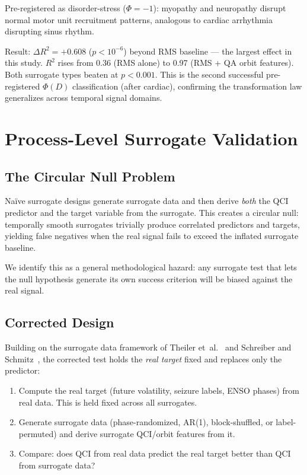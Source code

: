 \documentclass[11pt,a4paper]{article}
\begin{document}
Pre-registered as disorder-stress ($\Phi = -1$): myopathy and neuropathy
disrupt normal motor unit recruitment patterns, analogous to cardiac
arrhythmia disrupting sinus rhythm.

Result: $\Delta R^2 = +0.608$ ($p < 10^{-6}$) beyond RMS baseline ---
the largest effect in this study. $R^2$ rises from 0.36 (RMS alone) to
0.97 (RMS + QA orbit features). Both surrogate types beaten at
$p < 0.001$. This is the second successful pre-registered $\Phi(D)$
classification (after cardiac), confirming the transformation law
generalizes across temporal signal domains.

\section{Process-Level Surrogate Validation}
\label{sec:surrogates}

\subsection{The Circular Null Problem}

Na\"ive surrogate designs generate surrogate data and then derive
\emph{both} the QCI predictor and the target variable from the surrogate.
This creates a circular null: temporally smooth surrogates trivially produce
correlated predictors and targets, yielding false negatives when the
real signal fails to exceed the inflated surrogate baseline.

We identify this as a general methodological hazard: any surrogate test
that lets the null hypothesis generate its own success criterion will be
biased against the real signal.

\subsection{Corrected Design}

Building on the surrogate data framework of Theiler et~al.~\cite{theiler1992}
and Schreiber and Schmitz~\cite{schreiber2000}, the corrected test holds
the \emph{real target} fixed and replaces only the predictor:

\begin{enumerate}
  \item Compute the real target (future volatility, seizure labels, ENSO phases)
    from real data. This is held fixed across all surrogates.
  \item Generate surrogate data (phase-randomized, AR(1), block-shuffled, or
    label-permuted) and derive surrogate QCI/orbit features from it.
  \item Compare: does QCI from real data predict the real target better than
    QCI from surrogate data?
\end{enumerate}
\end{document}
